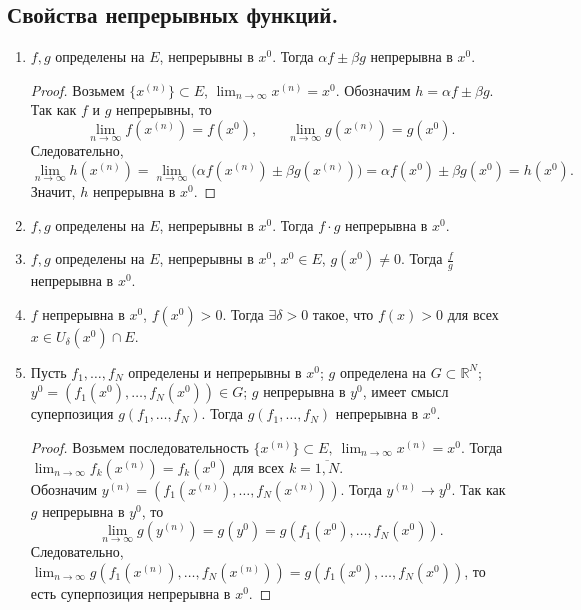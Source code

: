 \documentclass[12pt,a4paper]{report}
\begin{document}
\subsection{Свойства непрерывных функций.}
\begin{enumerate}
    \item $f, g$ определены на $E$, непрерывны в $x^0$. Тогда $\alpha f\pm \beta g$ непрерывна в $x^0$.
    \begin{proof}
        Возьмем $\{x^{(n)}\}\subset E$, $\lim_{n\to\infty}x^{(n)}=x^0$. Обозначим $h=\alpha f\pm \beta g$. \\
        Так как $f$ и $g$ непрерывны, то
        \[
        \lim_{n\to\infty} f(x^{(n)})=f(x^0), \qquad
        \lim_{n\to\infty} g(x^{(n)})=g(x^0).
        \]
        Следовательно,
        \[
        \lim_{n\to\infty} h(x^{(n)})
        =\lim_{n\to\infty}\bigl(\alpha f(x^{(n)})\pm \beta g(x^{(n)})\bigr)
        =\alpha f(x^0)\pm \beta g(x^0)=h(x^0).
        \]
        Значит, $h$ непрерывна в $x^0$.
    \end{proof}

    \item $f, g$ определены на $E$, непрерывны в $x^0$. Тогда $f\cdot g$ непрерывна в $x^0$.

    \item $f, g$ определены на $E$, непрерывны в $x^0$, $x^0\in E$, $g(x^0)\neq 0$. Тогда $\frac{f}{g}$ непрерывна в $x^0$.

    \item $f$ непрерывна в $x^0$, $f(x^0)>0$. Тогда $\exists \delta > 0$ такое, что $f(x) > 0$ для всех $x \in U_\delta(x^0)\cap E$.

        \item Пусть $f_1, \dots, f_N$ определены и непрерывны в $x^0$; $g$ определена на $G\subset \mathbb R^N$; $y^0=(f_1(x^0),\dots,f_N(x^0))\in G$; $g$ непрерывна в $y^0$, имеет смысл суперпозиция $g(f_1,\dots ,f_N)$. Тогда $g(f_1,\dots, f_N)$ непрерывна в $x^0$.
    \begin{proof}
        Возьмем последовательность $\{x^{(n)}\}\subset E,\ \lim_{n\to\infty}x^{(n)}=x^0$. Тогда $\lim_{n\to\infty} f_k(x^{(n)})=f_k(x^0)$ для всех $k=\overline{1,N}$. \\
        Обозначим $y^{(n)}=(f_1(x^{(n)}),\dots,f_N(x^{(n)}))$. Тогда $y^{(n)}\to y^0$. Так как $g$ непрерывна в $y^0$, то
        \[
        \lim_{n\to\infty} g(y^{(n)})=g(y^0)=g(f_1(x^0),\dots,f_N(x^0)).
        \]
        Следовательно, $\lim_{n\to\infty} g(f_1(x^{(n)}),\dots,f_N(x^{(n)}))=g(f_1(x^0),\dots,f_N(x^0))$, то есть суперпозиция непрерывна в $x^0$.
    \end{proof}
\end{enumerate}
\end{document}
